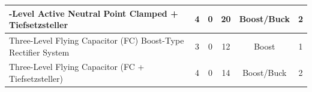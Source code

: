\begin{table}
\begin{tabular}{|>{\centering\arraybackslash}p{3cm}|c|c|c|c|c|}
	\hline
	3-Level Active Neutral Point Clamped + Tiefsetzsteller & \cellcolor{yellow!25}4 &\cellcolor{green!25} 0 & \cellcolor{red!25}20 & \cellcolor{green!25}Boost/Buck & \cellcolor{red!25}2 \\
	\hline
	Three-Level Flying Capacitor (FC) Boost-Type Rectifier System & \cellcolor{yellow!25}3 & \cellcolor{green!25}0 & \cellcolor{yellow!25}12 & \cellcolor{red!25}Boost & \cellcolor{green!25}1 \\
	\hline
	Three-Level Flying Capacitor (FC + Tiefsetzsteller) & \cellcolor{yellow!25}4 &\cellcolor{green!25}0 & \cellcolor{yellow!25}14 &\cellcolor{green!25} Boost/Buck &\cellcolor{red!25} 2 \\
	\hline
\end{tabular}
\end{table}
